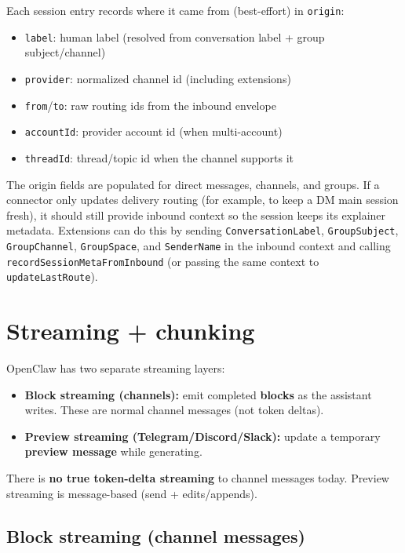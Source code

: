 Each session entry records where it came from (best-effort) in \texttt{origin}:

\begin{itemize}
  \item \texttt{label}: human label (resolved from conversation label + group subject/channel)
  \item \texttt{provider}: normalized channel id (including extensions)
  \item \texttt{from}/\texttt{to}: raw routing ids from the inbound envelope
  \item \texttt{accountId}: provider account id (when multi-account)
  \item \texttt{threadId}: thread/topic id when the channel supports it
\end{itemize}

The origin fields are populated for direct messages, channels, and groups. If a
connector only updates delivery routing (for example, to keep a DM main session
fresh), it should still provide inbound context so the session keeps its
explainer metadata. Extensions can do this by sending \texttt{ConversationLabel},
\texttt{GroupSubject}, \texttt{GroupChannel}, \texttt{GroupSpace}, and \texttt{SenderName} in the inbound
context and calling \texttt{recordSessionMetaFromInbound} (or passing the same context
to \texttt{updateLastRoute}).


\clearpage

\section{Streaming + chunking}


OpenClaw has two separate streaming layers:

\begin{itemize}
  \item \textbf{Block streaming (channels):} emit completed \textbf{blocks} as the assistant writes. These are normal channel messages (not token deltas).
  \item \textbf{Preview streaming (Telegram/Discord/Slack):} update a temporary \textbf{preview message} while generating.
\end{itemize}


There is \textbf{no true token-delta streaming} to channel messages today. Preview streaming is message-based (send + edits/appends).

\subsection{Block streaming (channel messages)}


